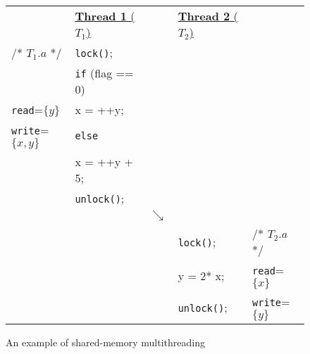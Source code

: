 \begin{figure}[t]
\centering
\myfontsize
{
\begin{tabular}
{m{1.5cm} m{2cm} m{0.1cm} m{1.8cm} m{1.2cm}}
&\underline{{\bf Thread 1} ($T_1$)} & & \underline{ {\bf Thread 2}  ($T_2$)} &\\ 
 

/* \underline{$T_{1}.a$} */ & {\tt lock()}; && &\\
& {\tt if} (flag == 0) && &\\
{\tt read}=$\{y\}$  & \hspace{3mm} x = ++y;&& &\\
{\tt write}=$\{x, y\}$  & {\tt else} && &\\
&\hspace{3mm}   x = ++y + 5;&& &\\
  & {\tt unlock()};&& &\\
        &  &  $\searrow$ & & \\
   

&&  & {\tt lock()}; &  /* \underline{$T_{2}.a$ }*/\\
&&  & y = 2* x;    & {\tt read}=$\{x\}$  \\
&  &  & {\tt unlock()}; &  {\tt write}=$\{y\}$ \\  
\end{tabular}
}


\caption{ An example of shared-memory multithreading}
\label{fig:simple-example}
\end{figure}
